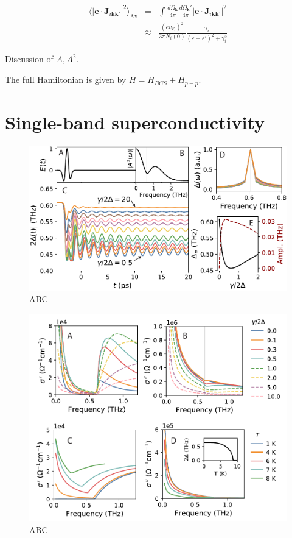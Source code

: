 \documentclass[aps,prb,reprint,noeprint,superscriptaddress]{revtex4-2}
\begin{document}
\begin{eqnarray*}
	\langle \left|\mathbf{e} \cdot
	\mathbf{J}_{i\mathbf{kk'}}\right|^2\rangle_{\text{Av}}
	&=& \int \frac{d\Omega_\mathbf{k}}{4\pi} \frac{d\Omega_\mathbf{k}'}{4\pi}
	\left|\mathbf{e} \cdot \mathbf{J}_{i\mathbf{kk'}}\right|^2
	\\
	&\approx& \frac{(e v_{F_i})^2}{3 \pi N_i(0)} 
	\frac{\gamma_i}{(\varepsilon-\varepsilon')^2 + \gamma_i^2}
\end{eqnarray*}

Discussion of $A, A^2$.

The full Hamiltonian is given by $H = H_{BCS} + H_{p-p}$.






\section{Single-band superconductivity}

\begin{figure}[ht]
	\centering
	\includegraphics[width=\columnwidth]{figures/fig1.pdf}
	\caption{ABC}
\end{figure}

\begin{figure}[ht]
	\centering
	\includegraphics[width=\columnwidth]{figures/fig2.pdf}
	\caption{ABC}
\end{figure}
\end{document}
